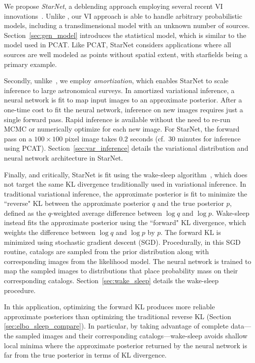 \nopagebreak[4]

We propose {\itshape StarNet}, a deblending approach employing several recent VI innovations~\cite{zhang2019advances,le2020revisiting}.
Unlike \cite{regier2019_celeste}, our VI approach is able to handle arbitrary probabilistic models, including a transdimensional model with an unknown number of sources. Section~\ref{sec:gen_model} introduces the statistical model, which is similar to the model used in PCAT. Like PCAT, StarNet considers applications where all sources are well modeled as points without spatial extent, with starfields being a primary example. 

Secondly, unlike~\cite{regier2019_celeste}, 
we employ {\itshape amortization}, which enables StarNet to scale inference to large astronomical surveys. 
In amortized variational inference, a neural network is fit to map input images to an approximate posterior.
After a one-time cost to fit the neural network, inference 
on new images requires just a single forward pass.
Rapid inference is available without the need to re-run MCMC or numerically optimize for each new image. 
For StarNet, the forward pass on 
a $100 \times 100$ pixel image takes $0.2$ seconds (cf.~30 minutes for inference using PCAT).
Section~\ref{sec:var_inference} details the variational distribution and neural network architecture in StarNet. 

Finally, and critically, StarNet is fit using the wake-sleep algorithm~\cite{Hinton1995wake_sleep}, which does not target the same KL divergence traditionally used in  variational inference. In traditional variational inference, the approximate posterior is fit to minimize the ``reverse" KL between the approximate posterior $q$ and the true posterior $p$, defined as the $q$-weighted average difference between $\log q$ and $\log p$. 
Wake-sleep instead fits the approximate posterior using the ``forward" KL divergence, which weights the difference between $\log q$ and $\log p$ by $p$.
The forward KL is minimized using stochastic gradient descent (SGD). 
Procedurally, in this SGD routine, catalogs are sampled from the prior distribution along with corresponding images from the likelihood model. 
The neural network is trained to map the sampled images to distributions that place probability mass on their corresponding catalogs. Section~\ref{sec:wake_sleep} details the wake-sleep procedure. 

In this application, optimizing the forward KL produces more reliable approximate posteriors than optimizing the traditional reverse KL (Section \ref{sec:elbo_sleep_compare}). 
In particular, by taking advantage of complete data---the sampled images and their corresponding catalogs---wake-sleep avoids shallow local minima where the approximate posterior returned by the neural network is far from the true posterior in terms of KL divergence. 

